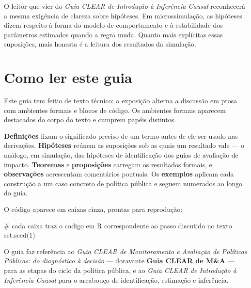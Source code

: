 \documentclass[12pt, a4paper, openany]{book}
\numberwithin{equation}{chapter}
\numberwithin{table}{chapter}
\numberwithin{figure}{chapter}
\theoremstyle{break}
\begin{document}
O leitor que vier do \textit{Guia CLEAR de Introdu\c{c}\~ao \`a Infer\^encia Causal}
reconhecer\'a a mesma exig\^encia de clareza sobre hip\'oteses. Em
microssimula\c{c}\~ao, as hip\'oteses dizem respeito \`a forma do modelo de
comportamento e \`a estabilidade dos par\^ametros estimados quando a regra muda.
Quanto mais expl\'icitas essas suposi\c{c}\~oes, mais honesta \'e a leitura dos
resultados da simula\c{c}\~ao.
\newpage

\thispagestyle{empty}
\section*{Como ler este guia}
Este guia tem feitio de texto t\'ecnico: a exposi\c{c}\~ao alterna a discuss\~ao em
prosa com ambientes formais e blocos de c\'odigo. Os ambientes formais aparecem
destacados do corpo do texto e cumprem pap\'eis distintos.

\vspace{0.2cm}
\noindent\textbf{Defini\c{c}\~oes} fixam o significado preciso de um termo antes de
ele ser usado nas deriva\c{c}\~oes. \textbf{Hip\'oteses} re\'unem as suposi\c{c}\~oes
sob as quais um resultado vale --- o an\'alogo, em simula\c{c}\~ao, das hip\'oteses
de identifica\c{c}\~ao dos guias de avalia\c{c}\~ao de impacto. \textbf{Teoremas} e
\textbf{proposi\c{c}\~oes} carregam os resultados formais, e \textbf{observa\c{c}\~oes}
acrescentam coment\'arios pontuais. Os \textbf{exemplos} aplicam cada constru\c{c}\~ao
a um caso concreto de pol\'itica p\'ublica e seguem numerados ao longo do guia.

\vspace{0.3cm}
\noindent O c\'odigo aparece em caixas cinza, prontas para reprodu\c{c}\~ao:
\begin{RCodeBox}
# cada caixa traz o codigo em R correspondente ao passo discutido no texto
set.seed(1)
\end{RCodeBox}
\vspace{0.3cm}

\noindent O guia faz refer\^encia ao \textit{Guia CLEAR de Monitoramento e
Avalia\c{c}\~ao de Pol\'iticas P\'ublicas: do diagn\'ostico \`a decis\~ao} ---
doravante \textbf{Guia CLEAR de M\&A} --- para as etapas do ciclo da pol\'itica
p\'ublica, e ao \textit{Guia CLEAR de Introdu\c{c}\~ao \`a Infer\^encia Causal}
para o arcabou\c{c}o de identifica\c{c}\~ao, estima\c{c}\~ao e infer\^encia.
\newpage
\end{document}

